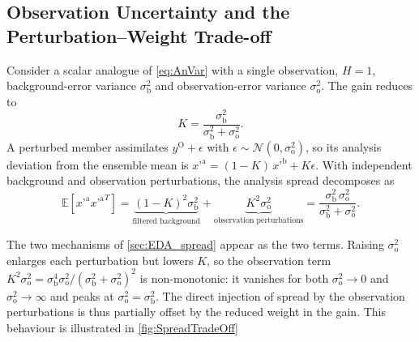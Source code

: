 \begin{subappendices}
    \section{Observation Uncertainty and the Perturbation--Weight Trade-off}
    \label{sec:EDA_ObsUncPert}

    Consider a scalar analogue of \cref{eq:AnVar} with a single
    observation, $H = 1$, background-error variance $\sigma_{\mathrm{b}}^2$ and
    observation-error variance $\sigma_{\mathrm{o}}^2$. The gain reduces to
    \begin{equation}
        K = \frac{\sigma_{\mathrm{b}}^2}{\sigma_{\mathrm{b}}^2 + \sigma_{\mathrm{o}}^2}.
    \end{equation}
    A perturbed member assimilates $y^{\mathrm{O}} + \epsilon$ with
    $\epsilon \sim \mathcal{N}(0, \sigma_{\mathrm{o}}^2)$, so its analysis
    deviation from the ensemble mean is
    $x’^{\mathrm{a}} = (1-K)\, x’^{\mathrm{b}} + K\epsilon$. With
    independent background and observation perturbations, the analysis spread
    decomposes as
    \begin{equation}\label{eq:scalarspread}
        \mathbb{E}[x’^{\mathrm{a}}{x’^{\mathrm{a}}}^T]
        = \underbrace{(1-K)^2 \sigma_{\mathrm{b}}^2}_{\text{filtered background}}
        + \underbrace{K^2 \sigma_{\mathrm{o}}^2}_{\text{observation perturbations}}
        = \frac{\sigma_{\mathrm{b}}^2\,\sigma_{\mathrm{o}}^2}
        {\sigma_{\mathrm{b}}^2 + \sigma_{\mathrm{o}}^2}.
    \end{equation}

    The two mechanisms of \cref{sec:EDA_spread} appear as the two terms. Raising
    $\sigma_{\mathrm{o}}^2$ enlarges each perturbation but lowers $K$, so the
    observation term
    $K^2 \sigma_{\mathrm{o}}^2
        = \sigma_{\mathrm{b}}^4 \sigma_{\mathrm{o}}^2 /
        (\sigma_{\mathrm{b}}^2 + \sigma_{\mathrm{o}}^2)^2$
    is non-monotonic: it vanishes for both $\sigma_{\mathrm{o}}^2 \to 0$ and
    $\sigma_{\mathrm{o}}^2 \to \infty$ and peaks at
    $\sigma_{\mathrm{o}}^2 = \sigma_{\mathrm{b}}^2$. The direct injection of spread
    by the observation perturbations is thus partially offset by the reduced
    weight in the gain. This behaviour is illustrated in \cref{fig:SpreadTradeOff}


\end{subappendices}
